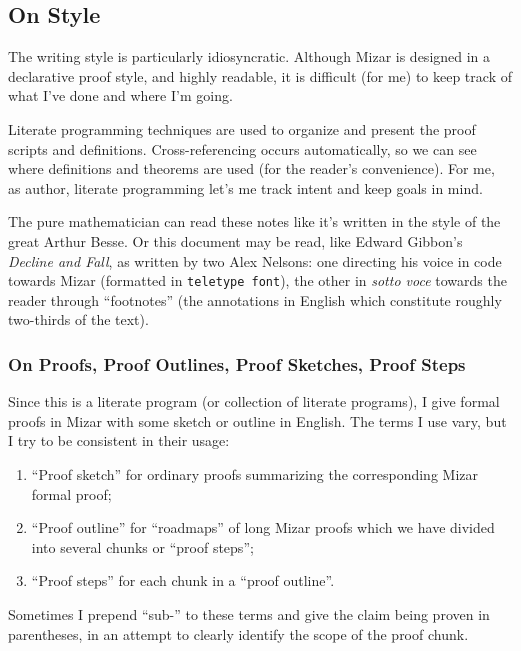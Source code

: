 
\subsection*{On Style}
The writing style is particularly idiosyncratic. Although Mizar is
designed in a declarative proof style, and highly readable, it is
difficult (for me) to keep track of what I've done and where I'm going.

Literate programming techniques are used to organize and present the
proof scripts and definitions. Cross-referencing occurs automatically,
so we can see where definitions and theorems are used (for the reader's
convenience). For me, as author, literate programming let's me track
intent and keep goals in mind.

The pure mathematician can read these notes like it's written in the
style of the great Arthur Besse. Or this document may be read, like
Edward Gibbon's
\emph{Decline and Fall}, as written by two Alex Nelsons: one directing
his voice in code towards Mizar (formatted in \verb#teletype font#), the
other in \emph{sotto voce} towards the reader through ``footnotes'' (the
annotations in English which constitute roughly two-thirds of the text).

\bigbreak
\subsubsection*{On Proofs, Proof Outlines, Proof Sketches, Proof Steps}
Since this is a literate program (or collection of literate programs), I
give formal proofs in Mizar with some sketch or outline in English. The
terms I use vary, but I try to be consistent in their usage:
\begin{enumerate}
\item ``Proof sketch'' for ordinary proofs summarizing the corresponding
Mizar formal proof;
\item ``Proof outline'' for ``roadmaps'' of long Mizar proofs which we
have divided into several chunks or ``proof steps'';
\item ``Proof steps'' for each chunk in a ``proof outline''.
\end{enumerate}
Sometimes I prepend ``sub-'' to these terms and give the claim being
proven in parentheses, in an attempt to clearly identify the scope of
the proof chunk.

